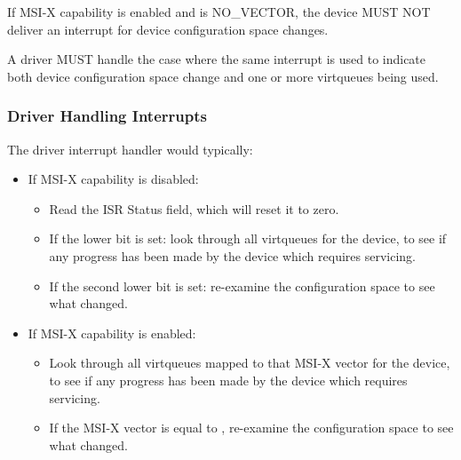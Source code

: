 If MSI-X capability is enabled and  is
NO_VECTOR, the device MUST NOT deliver an interrupt
for device configuration space changes.


A driver MUST handle the case where the same interrupt is used to indicate
both device configuration space change and one or more virtqueues being used.

\subsubsection{Driver Handling Interrupts}\label{sec:Virtio Transport Options / Virtio Over PCI Bus / PCI-specific Initialization And Device Operation / Driver Handling Interrupts}
The driver interrupt handler would typically:

\begin{itemize}
  \item If MSI-X capability is disabled:
    \begin{itemize}
      \item Read the ISR Status field, which will reset it to zero.
      \item If the lower bit is set:
        look through all virtqueues for the
        device, to see if any progress has been made by the device
        which requires servicing.
      \item If the second lower bit is set:
        re-examine the configuration space to see what changed.
    \end{itemize}
  \item If MSI-X capability is enabled:
    \begin{itemize}
      \item
        Look through all virtqueues mapped to that MSI-X vector for the
        device, to see if any progress has been made by the device
        which requires servicing.
      \item
        If the MSI-X vector is equal to ,
        re-examine the configuration space to see what changed.
    \end{itemize}
\end{itemize}

